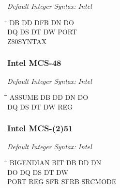 {\em Default Integer Syntax: Intel}

{\tt\begin{tabbing}
\hspace{3cm}\=\hspace{3cm}\=\hspace{3cm}\=\hspace{3cm}\=\kill    
DB         \> DD          \> DFB         \> DN          \> DO \\
DQ         \> DS          \> DT          \> DW          \> PORT \\
Z80SYNTAX \\
\end{tabbing}}

\subsubsection{Intel MCS-48}

{\em Default Integer Syntax: Intel}

{\tt\begin{tabbing}
\hspace{3cm}\=\hspace{3cm}\=\hspace{3cm}\=\hspace{3cm}\=\kill
ASSUME     \> DB         \> DD          \> DN          \> DO \\
DQ         \> DS         \> DT          \> DW          \> REG \\
\end{tabbing}}

\subsubsection{Intel MCS-(2)51}

{\em Default Integer Syntax: Intel}

{\tt\begin{tabbing}
\hspace{3cm}\=\hspace{3cm}\=\hspace{3cm}\=\hspace{3cm}\=\kill
BIGENDIAN  \> BIT         \> DB          \> DD          \> DN \\
DO         \> DQ          \> DS          \> DT          \> DW \\
PORT       \> REG         \> SFR         \> SFRB        \> SRCMODE \\
\end{tabbing}}

